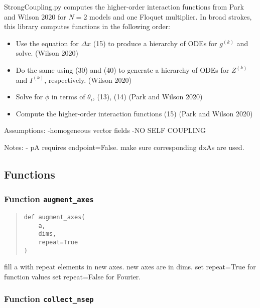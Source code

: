 \documentclass[english,a4paper,oneside]{article}
\providecommand{\tightlist}{%
  \setlength{\itemsep}{0pt}\setlength{\parskip}{0pt}}
\begin{document}
StrongCoupling.py computes the higher-order interaction functions from
Park and Wilson 2020 for \(N=2\) models and one Floquet multiplier. In
broad strokes, this library computes functions in the following order:

\begin{itemize}
\tightlist
\item
  Use the equation for \(\Delta x\) (15) to produce a hierarchy of ODEs
  for \(g^{(k)}\) and solve. (Wilson 2020)
\item
  Do the same using (30) and (40) to generate a hierarchy of ODEs for
  \(Z^{(k)}\) and \(I^{(k)}\), respectively. (Wilson 2020)
\item
  Solve for \(\phi\) in terms of \(\theta_i\), (13), (14) (Park and
  Wilson 2020)
\item
  Compute the higher-order interaction functions (15) (Park and Wilson
  2020)
\end{itemize}

Assumptions: -homogeneous vector fields -NO SELF COUPLING

Notes: - pA requires endpoint=False. make sure corresponding dxAs are
used.

\hypertarget{functions}{%
\subsection{Functions}\label{functions}}

\hypertarget{nBodyCoupling.augment_axes}{%
\subsubsection{\texorpdfstring{Function
\texttt{augment\_axes}}{Function augment\_axes}}\label{nBodyCoupling.augment_axes}}

\begin{quote}
\begin{verbatim}
def augment_axes(
    a,
    dims,
    repeat=True
)
\end{verbatim}
\end{quote}

fill a with repeat elements in new axes. new axes are in dims. set
repeat=True for function values set repeat=False for Fourier.

\hypertarget{nBodyCoupling.collect_nsep}{%
\subsubsection{\texorpdfstring{Function
\texttt{collect\_nsep}}{Function collect\_nsep}}\label{nBodyCoupling.collect_nsep}}
\end{document}
